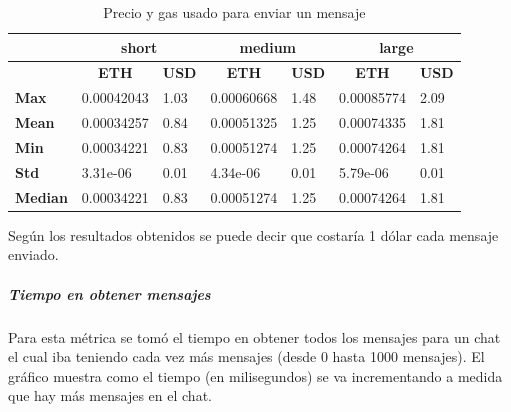 \setlength\tabcolsep{1pt}
\begin{table}[H]
    \centering
    \begin{tabular}{|l|ll|ll|ll|}
    \hline
     & \multicolumn{2}{c|}{\textbf{short}} & \multicolumn{2}{c|}{\textbf{medium}} & \multicolumn{2}{c|}{\textbf{large}} \\ \hline
     & \multicolumn{1}{c|}{\textbf{ETH}} & \multicolumn{1}{c|}{\textbf{USD}} & \multicolumn{1}{c|}{\textbf{ETH}} & \multicolumn{1}{c|}{\textbf{USD}} & \multicolumn{1}{c|}{\textbf{ETH}} & \multicolumn{1}{c|}{\textbf{USD}} \\
     \hline
    \textbf{Max} & \multicolumn{1}{l|}{0.00042043} & 1.03 & \multicolumn{1}{l|}{0.00060668} & 1.48 & \multicolumn{1}{l|}{0.00085774} & 2.09 \\
    \hline
    \textbf{Mean} & \multicolumn{1}{l|}{0.00034257} & 0.84 & \multicolumn{1}{l|}{0.00051325} & 1.25 & \multicolumn{1}{l|}{0.00074335} & 1.81 \\
    \hline
    \textbf{Min} & \multicolumn{1}{l|}{0.00034221} & 0.83 & \multicolumn{1}{l|}{0.00051274} & 1.25 & \multicolumn{1}{l|}{0.00074264} & 1.81 \\
    \hline
    \textbf{Std} & \multicolumn{1}{l|}{3.31e-06} & 0.01 & \multicolumn{1}{l|}{4.34e-06} & 0.01 & \multicolumn{1}{l|}{5.79e-06} & 0.01 \\
    \hline
    \textbf{Median} & \multicolumn{1}{l|}{0.00034221} & 0.83 & \multicolumn{1}{l|}{0.00051274} & 1.25 & \multicolumn{1}{l|}{0.00074264} & 1.81 \\
    \hline
    \end{tabular}
    \caption{Precio y gas usado para enviar un mensaje}
\end{table}

Según los resultados obtenidos se puede decir que costaría 1 dólar cada mensaje enviado.

\subparagraph{Tiempo en obtener mensajes}

Para esta métrica se tomó el tiempo en obtener todos los mensajes para un chat el cual iba teniendo cada vez más mensajes (desde 0 hasta 1000 mensajes). El gráfico muestra como el tiempo (en milisegundos) se va incrementando a medida que hay más mensajes en el chat.

